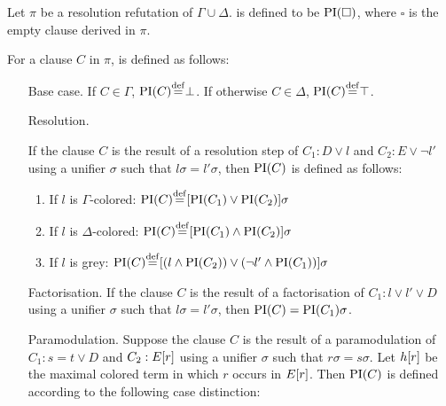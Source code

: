 \begin{defi}
	\label{def:PI}
	Let $\pi$ be a resolution refutation of $\Gamma \cup \Delta$.
	 is defined to be $\operatorname{PI}(\square)$, where $\square$ is the empty clause derived in $\pi$.

	For a clause $C$ in $\pi$,  is defined as follows:
	\begin{itemize}
		\item[Base case.]
			If $C \in \Gamma$, $\PI(C) \defeq \bot$.
			If otherwise $C \in \Delta$, $\PI(C) \defeq \top$.
		\item[Resolution.]
			\label{def:PI_resolution}

			If the clause $C$ is the result of a resolution step of $C_1: D \lor l$ and $C_2: E \lor \lnot l'$ using a unifier $\sigma$ such that $l\sigma = l'\sigma$, then $\operatorname{PI}(C)$ is defined as follows:
			\begin{enumerate}
				\item If $l$ is $\Gamma$-colored: $\PI(C) \defeq{} [\PI(C_1) \lor \PI(C_2)]\sigma$
				\item If $l$ is $\Delta$-colored: $\PI(C) \defeq{} [\PI(C_1) \land \PI(C_2)]\sigma$
				\item If $l$ is grey: $\PI(C) \defeq{} [(l \land \PI(C_2)) \lor (\lnot l' \land \PI(C_1)) ]\sigma $
			\end{enumerate}

		\item[Factorisation.]
			If the clause $C$ is the result of a factorisation of $C_1: l \lor l' \lor D$ using a unifier $\sigma$ such that $l\sigma = l'\sigma$, then $\operatorname{PI}(C) = \operatorname{PI}(C_1)\sigma$.

		\item[Paramodulation.]
			\label{def:PI_paramod}
			Suppose the clause $C$ is the result of a paramodulation of $C_1: s=t \lor D$ and $C_2: E[r]$ using a       unifier $\sigma$ such that $r\sigma = s\sigma$.
			Let $h[r]$ be the maximal colored term in which $r$ occurs in $E[r]$.
			Then $\operatorname{PI}(C)$ is defined according to the following case distinction:
			\begin{enumerate}


\end{enumerate}
\end{itemize}
\end{defi}
